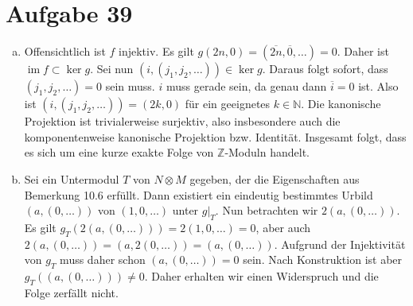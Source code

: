 \documentclass{article}
\theoremstyle{definition}
\newcommand{\N}{\mathbb{N}}
\newcommand{\Z}{\mathbb{Z}}
\newcommand{\im}{\operatorname{im}}
\begin{document}
\section*{Aufgabe 39}
\begin{enumerate}[(a)]
    \item Offensichtlich ist $f$ injektiv. Es gilt $g(2n,0) = (\overline{2n},\overline{0},\dots) = 0$. Daher ist $\im f \subset \ker g$. Sei nun $(i,(j_1,j_2,\dots)) \in \ker g$. Daraus folgt sofort, dass $(j_1,j_2,\dots) = 0$ sein muss. $i$ muss gerade sein, da genau dann $\overline{i} = 0$ ist. Also ist $(i,(j_1,j_2,\dots)) = (2k,0)$ für ein geeignetes $k\in \N$. Die kanonische Projektion ist trivialerweise surjektiv, also insbesondere auch die komponentenweise kanonische Projektion bzw. Identität. Insgesamt folgt, dass es sich um eine kurze exakte Folge von $\Z$-Moduln handelt.
    \item Sei ein Untermodul $T$ von $N\otimes M$ gegeben, der die Eigenschaften aus Bemerkung 10.6 erfüllt. Dann existiert ein eindeutig bestimmtes Urbild $(a,(0,\dots))$ von $(1,0,\dots)$ unter $g|_{T}$. Nun betrachten wir $2(a,(0,\dots))$. Es gilt $g_{T}(2(a,(0,\dots))) = 2(1,0,\dots) = 0$, aber auch $2(a,(0,\dots)) = (a,2(0,\dots)) = (a,(0,\dots))$. Aufgrund der Injektivität von $g_{T}$ muss daher schon $(a,(0,\dots)) = 0$ sein. Nach Konstruktion ist aber $g_{T}((a,(0,\dots))) \neq 0$. Daher erhalten wir einen Widerspruch und die Folge zerfällt nicht.
\end{enumerate}
\end{document}
